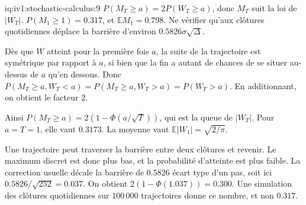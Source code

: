 \begin{solution}{iq:iv1:stochastic-calculus:9}
$P(M_T \ge a) = 2P(W_T \ge a)$, donc $M_T$ suit la loi de $|W_T|$. $P(M_1 \ge 1) = 0.317$, et $\mathbb{E}M_1 = 0.798$. Ne vérifier qu'aux clôtures quotidiennes déplace la barrière d'environ $0.5826\sigma\sqrt{\Delta}$.

Dès que $W$ atteint pour la première fois $a$, la suite de la trajectoire est symétrique par rapport à $a$, si bien que la fin a autant de chances de se situer au-dessus de $a$ qu'en dessous. Donc $P(M_T \ge a, W_T < a) = P(M_T \ge a, W_T > a) = P(W_T > a)$. En additionnant, on obtient le facteur 2.

Ainsi $P(M_T \ge a) = 2(1 - \Phi(a/\sqrt{T}))$, qui est la queue de $|W_T|$. Pour $a = T = 1$, elle vaut $0.3173$. La moyenne vaut $\mathbb{E}|W_1| = \sqrt{2/\pi}$.

Une trajectoire peut traverser la barrière entre deux clôtures et revenir. Le maximum discret est donc plus bas, et la probabilité d'atteinte est plus faible. La correction usuelle décale la barrière de $0.5826$ écart type d'un pas, soit ici $0.5826/\sqrt{252} = 0.037$. On obtient $2(1 - \Phi(1.037)) = 0.300$. Une simulation des clôtures quotidiennes sur $100\,000$ trajectoires donne ce nombre, et non $0.317$.



\end{solution}

